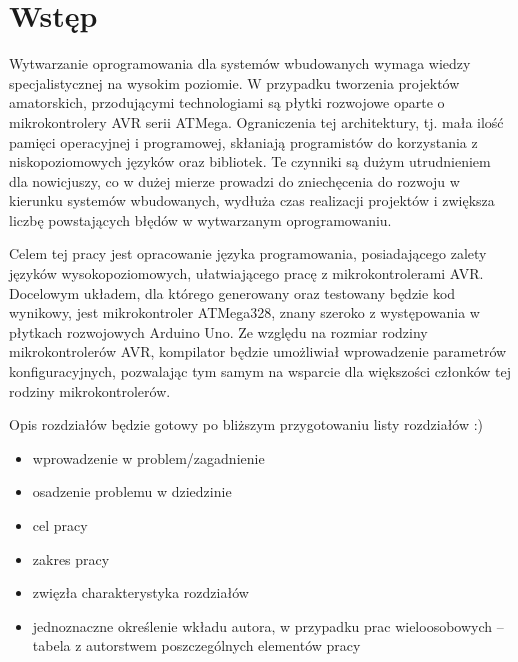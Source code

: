 \chapter{Wstęp}
\label{ch:wstep}


Wytwarzanie oprogramowania dla systemów wbudowanych wymaga wiedzy specjalistycznej na wysokim poziomie. W przypadku tworzenia projektów amatorskich, przodującymi technologiami są płytki rozwojowe oparte o mikrokontrolery AVR serii ATMega. Ograniczenia tej architektury, tj. mała ilość pamięci operacyjnej i programowej, skłaniają programistów do korzystania z niskopoziomowych języków oraz bibliotek. Te czynniki są dużym utrudnieniem dla nowicjuszy, co w dużej mierze prowadzi do zniechęcenia do rozwoju w kierunku systemów wbudowanych, wydłuża czas realizacji projektów i zwiększa liczbę powstających błędów w wytwarzanym oprogramowaniu.

Celem tej pracy jest opracowanie języka programowania, posiadającego zalety języków wysokopoziomowych, ułatwiającego pracę z mikrokontrolerami AVR. Docelowym układem, dla którego generowany oraz testowany będzie kod wynikowy, jest mikrokontroler ATMega328, znany szeroko z występowania w płytkach rozwojowych Arduino Uno. Ze względu na rozmiar rodziny mikrokontrolerów AVR, kompilator będzie umożliwiał wprowadzenie parametrów konfiguracyjnych, pozwalając tym samym na wsparcie dla większości członków tej rodziny mikrokontrolerów. 

Opis rozdziałów będzie gotowy po bliższym przygotowaniu listy rozdziałów :)

\begin{itemize}
\item wprowadzenie w problem/zagadnienie
\item osadzenie problemu w dziedzinie
\item cel pracy
\item zakres pracy
\item zwięzła charakterystyka rozdziałów
\item jednoznaczne określenie wkładu autora, w przypadku prac wieloosobowych – tabela z autorstwem poszczególnych elementów pracy
\end{itemize}